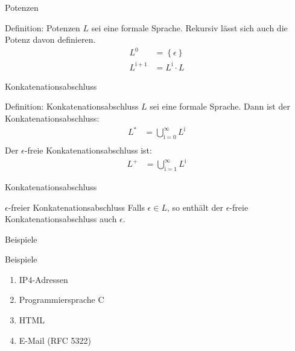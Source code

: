 \documentclass[18pt]{beamer}
\begin{document}
\begin{frame}{Potenzen}
    \begin{block}{Definition: Potenzen}
        $L$ sei eine formale Sprache. Rekursiv lässt sich auch die Potenz davon definieren.
        \begin{align*}
            L^0 &= \left\{ \epsilon\right\}\\
            L^\mathrm{i + 1} &= L^\mathrm{i} \cdot L
        \end{align*}
    \end{block}
\end{frame}
        
\begin{frame}{Konkatenationsabschluss}
    \begin{block}{Definition: Konkatenationsabschluss}
        $L$ sei eine formale Sprache. Dann ist der Konkatenationsabschluss:
        \begin{align*}
            L^* &= \bigcup_\mathrm{i = 0}^\infty L^\mathrm{i}\\
        \end{align*}
        Der $\epsilon$-freie Konkatenationsabschluss ist:
        \begin{align*}
            L^+ &= \bigcup_\mathrm{i = 1}^\infty L^\mathrm{i}
        \end{align*}
    \end{block}
\end{frame}

\begin{frame}{Konkatenationsabschluss}
    \begin{alertblock}{$\epsilon$-freier Konkatenationsabschluss}
        Falls $\epsilon \in L$, so enthält der $\epsilon$-freie Konkatenationsabschluss auch $\epsilon$.
    \end{alertblock}
\end{frame}

\begin{frame}{Beispiele}
    \begin{block}{Beispiele}
        \begin{enumerate}
            \item IP4-Adressen
            \item Programmiersprache C
            \item HTML
            \item E-Mail (RFC 5322)
        \end{enumerate}
    \end{block}
\end{frame}
\end{document}
